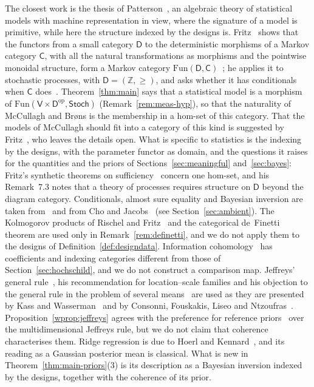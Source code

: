 \documentclass[11pt,a4paper]{article}
\theoremstyle{plain}
\theoremstyle{definition}
\theoremstyle{remark}
\newcommand{\cat}[1]{\mathsf{#1}}
\newcommand{\catV}{\cat{V}}
\newcommand{\catD}{\cat{D}}
\newcommand{\Stoch}{\cat{Stoch}}
\newcommand{\op}{\mathrm{op}}
\begin{document}
The closest work is the thesis of Patterson~\cite{patterson_algebra_2020}, an
algebraic theory of statistical models with machine representation in view,
where the signature of a model is primitive, while here the structure indexed
by the designs is. Fritz~\cite[\S7]{fritz_synthetic_2020} shows that the
functors from a small category $\catD$ to the deterministic morphisms of a
Markov category $\cat{C}$, with all the natural transformations as morphisms
and the pointwise monoidal structure, form a Markov category
$\mathrm{Fun}(\catD,\cat{C})$~\cite[Prop.~7.1]{fritz_synthetic_2020}; he
applies it to stochastic processes, with $\catD = (\mathbb{Z},\ge)$, and asks
whether it has conditionals when $\cat{C}$
does~\cite[Problem~11.9]{fritz_synthetic_2020}. Theorem~\ref{thm:main} says
that a statistical model is a morphism of
$\mathrm{Fun}(\catV\times\catD^{\op},\Stoch)$ (Remark~\ref{rem:meas-hyp}), so
that the naturality of McCullagh and Br\o ns is the membership in a hom-set of
this category. That the models of McCullagh should fit into a category of
this kind is suggested by
Fritz~\cite[Def.~14.1, footnote~29]{fritz_synthetic_2020}, who leaves the
details open. What is specific to statistics is the indexing by the designs,
with the parameter functor as domain, and the questions it raises for the
quantities and the priors of Sections~\ref{sec:meaningful}
and~\ref{sec:bayes}: Fritz's synthetic theorems on
sufficiency~\cite[Def.~14.1]{fritz_synthetic_2020} concern one hom-set, and
his Remark~7.3 notes that a theory of processes requires structure on $\catD$
beyond the diagram category.
Conditionals, almost sure equality and Bayesian inversion are taken
from~\cite{fritz_synthetic_2020} and from Cho and
Jacobs~\cite{cho_disintegration_2019} (see Section~\ref{sec:ambient}). The
Kolmogorov products of Rischel and Fritz~\cite{fritz_rischel_infinite_2020}
and the categorical de~Finetti theorem are used only in
Remark~\ref{rem:definetti}, and we do not apply them to the designs of
Definition~\ref{def:designdata}. Information
cohomology~\cite{baudot_homological_2015,vigneaux_information_2021} has
coefficients and indexing categories different from those of
Section~\ref{sec:hochschild}, and we do not construct a comparison map.
Jeffreys' general rule~\cite{jeffreys_invariant_1946}, his recommendation for
location--scale families and his objection to the general rule in the problem
of several means~\cite{jeffreys_theory_1961} are used as they are presented by
Kass and Wasserman~\cite{kass_selection_1996} and by Consonni, Fouskakis, Liseo
and Ntzoufras~\cite{consonni_prior_2018}. Proposition~\ref{wprop:jeffreys}
agrees with the preference for reference
priors~\cite{bernardo_reference_1979,berger_formal_2009} over the
multidimensional Jeffreys rule, but we do not claim that coherence
characterises them. Ridge regression is due to Hoerl and
Kennard~\cite{hoerl_ridge_1970}, and its reading as a Gaussian posterior mean
is classical. What is new in Theorem~\ref{thm:main-priors}(3) is its
description as a Bayesian inversion indexed by the designs, together with the
coherence of its prior.
\end{document}
